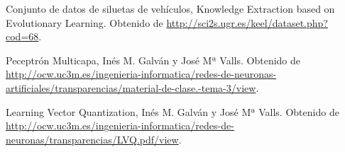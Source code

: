 \documentclass[11pt,spanish,listoffigures,listoftables]{workluis}
\begin{document}
\begin{thebibliography}{10}


   Conjunto de datos de siluetas de vehículos, 
   \newblock Knowledge Extraction based on Evolutionary Learning. 
   \newblock Obtenido de
   \url{http://sci2s.ugr.es/keel/dataset.php?cod=68}.

   Peceptrón Multicapa, 
   \newblock Inés M. Galván y José Mª Valls.
   \newblock Obtenido de
   \url{http://ocw.uc3m.es/ingenieria-informatica/redes-de-neuronas-artificiales/transparencias/material-de-clase.-tema-3/view}.

   Learning Vector Quantization, 
   \newblock Inés M. Galván y José Mª Valls.
   \newblock Obtenido de
   \url{http://ocw.uc3m.es/ingenieria-informatica/redes-de-neuronas/transparencias/LVQ.pdf/view}.

   

\end{thebibliography}
\cleardoublepage

\end{document}
